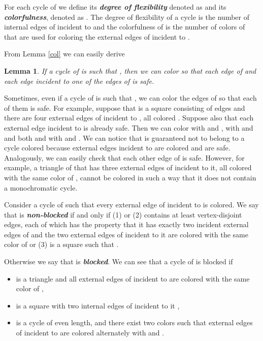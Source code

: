 \documentclass[a4, 11pt]{article}
\newcommand{\<}{\langle}
\renewcommand{\>}{\rangle}
\newtheorem{lemma}{Lemma}
\begin{document}
For each cycle  of  we define its {\bf \em degree of flexibility} denoted as  and its {\bf \em colorfulness}, denoted as . The degree of flexibility of a cycle   is the number of internal edges of  incident to  
and the colorfulness of  is the number of colors of  that are used for coloring the external edges of  incident to .

From Lemma \ref{col} we can easily derive 
\begin{lemma}\label{cola}
If a cycle  of  is such that , then we can color  so that each edge of  and each edge incident to one of the edges of  is safe.
\end{lemma}

Sometimes, even if a cycle  of  is such that  , we can color the edges of  so that each of them is safe.
For example, suppose that  is a square consisting of edges   and there are four external edges of  incident to , all colored  . Suppose also that each external edge incident to  is already safe. Then we can color  with  and ,
 with  and  and both  and  with  and . We can notice that  is guaranteed not to belong to a cycle colored  because external edges incident to  are colored  and are safe. Analogously, we can easily check that each other  edge of  is safe. However, for example, a triangle  of  that has three external edges of  incident to it, all colored with the same color of , cannot be colored in such a way that it does not contain a monochromatic cycle.

Consider a cycle  of  such that every external edge of  incident to  is colored. We say that   is {\bf \em  non-blocked} if and only if (1)     or   (2)    contains at least  vertex-disjoint edges, each of which has the property that it has exactly two incident external edges of  and the two external edges of   incident to it  are colored with the same color of  or (3)  is a square such that .

Otherwise we say that  is {\bf \em blocked}.
We can see  that a cycle  of  is  blocked  if
\begin{itemize}
\item  is a triangle and all external edges of  incident to  are colored with the same color of ,
\item  is a square with two internal edges of  incident to it ,
\item  is a cycle of even length,    and  there exist two colors  such that external edges of  incident to  are colored alternately with  and .
\end{itemize}
\end{document}
